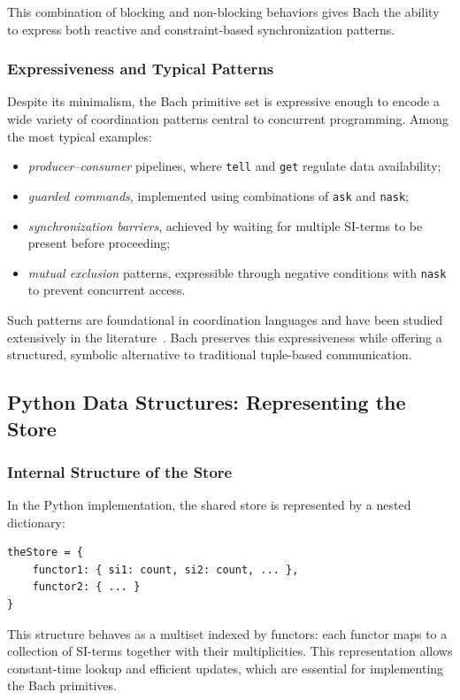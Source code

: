 This combination of blocking and non-blocking behaviors gives Bach the ability
to express both reactive and constraint-based synchronization patterns.

\subsubsection{Expressiveness and Typical Patterns}
Despite its minimalism, the Bach primitive set is expressive enough to encode a wide variety of coordination patterns central to concurrent programming. Among the most typical examples:

\begin{itemize}
    \item \emph{producer–consumer} pipelines, where \texttt{tell} and \texttt{get} regulate data availability;
    \item \emph{guarded commands}, implemented using combinations of \texttt{ask} and \texttt{nask};
    \item \emph{synchronization barriers}, achieved by waiting for multiple SI-terms to be present before proceeding;
    \item \emph{mutual exclusion} patterns, expressible through negative conditions with \texttt{nask} to prevent concurrent access.
\end{itemize}

Such patterns are foundational in coordination languages and have been studied extensively in the literature~\cite{gelernter1985generative,jacquet2007coordinating}. Bach preserves this expressiveness while offering a structured, symbolic alternative to traditional tuple-based communication.

\subsection{Python Data Structures: Representing the Store}

\subsubsection{Internal Structure of the Store}
In the Python implementation, the shared store is represented by a nested dictionary:

\begin{verbatim}
theStore = {
    functor1: { si1: count, si2: count, ... },
    functor2: { ... }
}
\end{verbatim}

This structure behaves as a multiset indexed by functors: each functor maps to a collection
of SI-terms together with their multiplicities. This representation allows constant-time
lookup and efficient updates, which are essential for implementing the Bach primitives.

